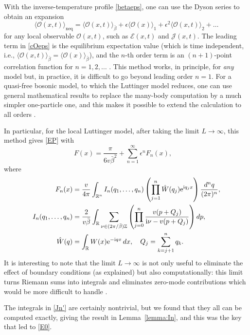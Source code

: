 \documentclass[12pt,a4paper]{article}
\newcommand{\ee}{{\rm e}}
\newcommand{\ii}{{\rm i}}
\newcommand{\R}{\mathbb{R}}
\newcommand{\Z}{\mathbb{Z}}
\newcommand{\cE}{\mathcal{E}}
\newcommand{\cJ}{\mathcal{J}}
\newcommand{\cO}{\mathcal{O}}
\theoremstyle{definition}
\theoremstyle{remark}
\begin{document}
With the inverse-temperature profile \eqref{betaeps}, one can use the Dyson
series to obtain an expansion
%
\begin{equation} 
\label{cOeps}
\langle\cO(x,t)\rangle_{\text{neq}}
= \langle \cO(x,t)\rangle_{\bar\beta}
	+ \epsilon \langle\cO(x)\rangle_1 + \epsilon^2 \langle\cO(x,t)\rangle_2 + \ldots 
\end{equation}
%
for any local observable $\cO(x,t)$, such as $\cE(x,t)$ and $\cJ(x,t)$.
The leading term in \eqref{cOeps} is the equilibrium expectation value (which is time independent, i.e., $\langle \cO(x,t)\rangle_{\bar\beta} = \langle \cO(x)\rangle_{\bar\beta}$), and the $n$-th order term is an $(n+1)$-point correlation function for $n=1,2,\ldots$ \cite{LLMM2}.
This method works, in principle, for {\it any} model but, in practice, it is difficult to go beyond leading order $n=1$.
For a quasi-free bosonic model, to which the Luttinger model reduces, one can use general mathematical results \cite{R,R1,GL} to replace the many-body computation by a much simpler one-particle one, and this makes it possible to extend the calculation to all orders \cite{LLMM2}. 

In particular, for the local Luttinger model, after taking the limit $L\to\infty$, this method gives \eqref{EP} with 
%
\begin{equation} 
\label{Fsum}
F(x) = \frac{\pi}{6v{\bar\beta}^{2}} + \sum_{n=1}^\infty \epsilon^n F_n(x),\quad 
\end{equation}
%
where
%
\begin{align} 
\label{Jn}
F_n(x)
& = \frac{v}{4\pi}\int_{\R^n}
		I_n(q_1,\ldots,q_n) \left( \prod_{j=1}^n\hat W(q_j)\ee^{\ii q_jx} \right)
		\frac{d^nq}{(2\pi)^n}, \\
\label{Jn'}
I_n(q_1,\ldots,q_n)
& = \frac{2}{v\bar\beta} \int_{\R}
		\sum_{\nu \in (2\pi/\bar\beta) \Z}
		\left( \prod_{j=0}^{n} \frac{v(p+Q_j)}{\ii\nu-v(p+Q_j)} \right) dp, \\
\label{Jn''}
\hat W(q)
& = \int_{\R} W(x) \ee^{-\ii qx} \, dx,
		\quad
		Q_j = \sum_{k=j+1}^n q_k.
\end{align}
%
It is interesting to note that the limit $L\to\infty$ is not only useful to eliminate the effect of boundary conditions (as explained) but also computationally: this limit turns Riemann sums into integrals and eliminates zero-mode contributions which would be more difficult to handle \cite{LLMM2}. 

The integrals in \eqref{Jn'} are certainly nontrivial, but we found that they all can be computed exactly, giving the result in Lemma~\ref{lemma:In}, and this was the key that led to \eqref{E0}. 
\end{document}
